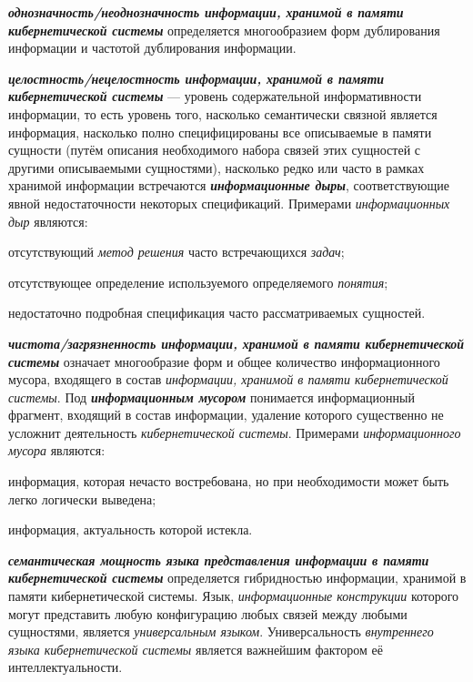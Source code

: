 \textbf{\textit{однозначность/неоднозначность информации, хранимой в памяти кибернетической системы}} определяется многообразием форм дублирования информации и частотой дублирования информации.

\textbf{\textit{целостность/нецелостность информации, хранимой в памяти кибернетической системы}} --- уровень содержательной информативности информации, то есть уровень того, насколько семантически связной является информация, насколько полно специфицированы все описываемые в памяти сущности (путём описания необходимого набора связей этих сущностей с другими описываемыми сущностями), насколько редко или часто в рамках хранимой информации встречаются \textbf{\textit{информационные дыры}}, соответствующие явной недостаточности некоторых спецификаций. 
Примерами \textit{информационных дыр} являются:
\begin{textitemize}
    \item отсутствующий \textit{метод решения} часто встречающихся \textit{задач};
    \item отсутствующее определение используемого определяемого \textit{понятия};
    \item недостаточно подробная спецификация часто рассматриваемых сущностей.
\end{textitemize}

\textbf{\textit{чистота/загрязненность информации, хранимой в памяти кибернетической системы}} означает многообразие форм и общее количество информационного мусора, входящего в состав \textit{информации, хранимой в памяти кибернетической системы}.
Под \textbf{\textit{информационным мусором}} понимается информационный фрагмент, входящий в состав информации, удаление которого существенно не усложнит деятельность \textit{кибернетической системы}.
Примерами \textit{информационного мусора} являются:
\begin{textitemize}
    \item информация, которая нечасто востребована, но при необходимости может быть легко логически выведена;
    \item информация, актуальность которой истекла.
\end{textitemize}

\textbf{\textit{семантическая мощность языка представления информации в памяти кибернетической системы}} определяется гибридностью информации, хранимой в памяти кибернетической системы. Язык, \textit{информационные конструкции} которого могут представить любую конфигурацию любых связей между любыми сущностями, является \textit{универсальным языком}.
Универсальность \textit{внутреннего языка кибернетической системы} является важнейшим фактором её интеллектуальности.

